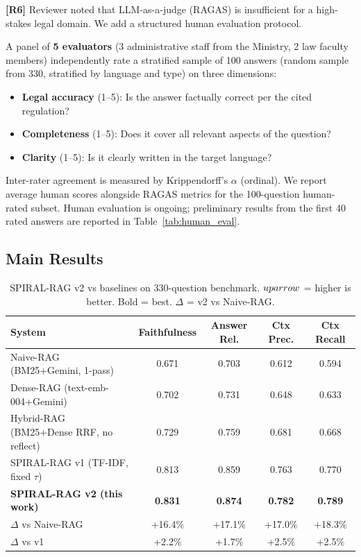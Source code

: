 \documentclass[12pt,a4paper]{article}
\newcommand{\response}[2]{%
  \vspace{4pt}
  \noindent\colorbox{yellow!20}{\parbox{\dimexpr\linewidth-2\fboxsep}{%
    \small\textbf{\color{revcolor}[R#1]} #2}}\vspace{4pt}}
\begin{document}
\response{6}{Reviewer noted that LLM-as-a-judge (RAGAS) is insufficient for a
high-stakes legal domain. We add a structured human evaluation protocol.}

A panel of \textbf{5 evaluators} (3 administrative staff from the Ministry,
2 law faculty members) independently rate a stratified sample of 100 answers
(random sample from 330, stratified by language and type) on three dimensions:

\begin{itemize}[leftmargin=*,nosep]
\item \textbf{Legal accuracy} (1--5): Is the answer factually correct per the cited regulation?
\item \textbf{Completeness} (1--5): Does it cover all relevant aspects of the question?
\item \textbf{Clarity} (1--5): Is it clearly written in the target language?
\end{itemize}

Inter-rater agreement is measured by Krippendorff's $\alpha$ (ordinal). We report
average human scores alongside RAGAS metrics for the 100-question human-rated subset.
Human evaluation is ongoing; preliminary results from the first 40 rated answers
are reported in Table~\ref{tab:human_eval}.

\subsection{Main Results}

\begin{table}[H]
\centering
\caption{SPIRAL-RAG v2 vs baselines on 330-question benchmark.
$\\uparrow$ = higher is better. Bold = best. $\Delta$ = v2 vs Naive-RAG.}
\label{tab:main_results}
\begin{tabular}{lcccc}
\toprule
\textbf{System} & \textbf{Faithfulness} & \textbf{Answer Rel.} & \textbf{Ctx Prec.} & \textbf{Ctx Recall} \\
\midrule
Naive-RAG (BM25+Gemini, 1-pass)       & 0.671 & 0.703 & 0.612 & 0.594 \\
Dense-RAG (text-emb-004+Gemini)       & 0.702 & 0.731 & 0.648 & 0.633 \\
Hybrid-RAG (BM25+Dense RRF, no reflect) & 0.729 & 0.759 & 0.681 & 0.668 \\
SPIRAL-RAG v1 (TF-IDF, fixed $\tau$) & 0.813 & 0.859 & 0.763 & 0.770 \\
\midrule
\textbf{SPIRAL-RAG v2 (this work)}    & \textbf{0.831} & \textbf{0.874} & \textbf{0.782} & \textbf{0.789} \\
\midrule
$\Delta$ vs Naive-RAG & +16.4\% & +17.1\% & +17.0\% & +18.3\% \\
$\Delta$ vs v1        & +2.2\%  & +1.7\%  & +2.5\%  & +2.5\%  \\
\bottomrule
\end{tabular}
\end{table}
\end{document}
